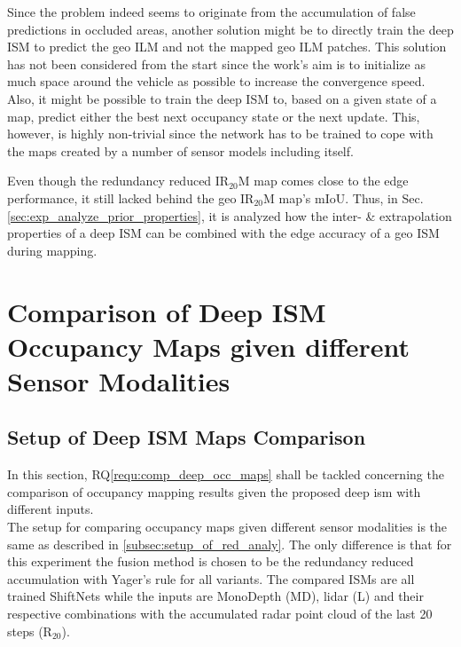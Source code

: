 Since the problem indeed seems to originate from the accumulation of false predictions in occluded areas, another solution might be to directly train the deep ISM to predict the geo ILM and not the mapped geo ILM patches. This solution has not been considered from the start since the work's aim is to initialize as much space around the vehicle as possible to increase the convergence speed. Also, it might be possible to train the deep ISM to, based on a given state of a map, predict either the best next occupancy state or the next update. This, however, is highly non-trivial since the network has to be trained to cope with the maps created by a number of sensor models including itself. 

Even though the redundancy reduced IR$_{20}$M map comes close to the edge performance, it still lacked behind the geo IR$_{20}$M map's mIoU. Thus, in Sec. \ref{sec:exp_analyze_prior_properties}, it is analyzed how the inter- \& extrapolation properties of a deep ISM can be combined with the edge accuracy of a geo ISM during mapping.
%
\section{Comparison of Deep ISM Occupancy Maps given different Sensor Modalities}
\label{sec:exp_comparison_deep_ism_maps_diff_sensors}
%
\subsection{Setup of Deep ISM Maps Comparison}
\label{subsec:setup_analyze_deep_ism_maps_diff_sensors}
In this section, RQ\ref{requ:comp_deep_occ_maps} shall be tackled concerning the comparison of occupancy mapping results given the proposed deep \gls{ism} with different inputs.\\
The setup for comparing occupancy maps given different sensor modalities is the same as described in \ref{subsec:setup_of_red_analy}. The only difference is that for this experiment the fusion method is chosen to be the redundancy reduced accumulation with Yager's rule for all variants. The compared ISMs are all trained ShiftNets while the inputs are MonoDepth (MD), lidar (L) and their respective combinations with the accumulated radar point cloud of the last 20 steps (R$_{20}$). 
%
